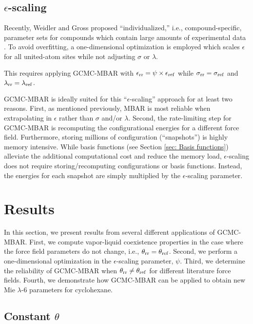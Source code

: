 \documentclass[journal=jced,manuscript=article]{achemso}
\begin{document}
\subsection{$\epsilon$-scaling}

Recently, Weidler and Gross proposed ``individualized,'' i.e., compound-specific, parameter sets for compounds which contain large amounts of experimental data \cite{Weidler2018}. To avoid overfitting, a one-dimensional optimization is employed which scales $\epsilon$ for all united-atom sites while not adjusting $\sigma$ or $\lambda$. 

This requires applying GCMC-MBAR with $\epsilon_{\rm rr} = \psi \times \epsilon_{\rm ref}$ while $\sigma_{\rm rr} = \sigma_{\rm ref}$ and $\lambda_{\rm rr} = \lambda_{\rm ref}$.

GCMC-MBAR is ideally suited for this ``$\epsilon$-scaling'' approach for at least two reasons. First, as mentioned previously, MBAR is most reliable when extrapolating in $\epsilon$ rather than $\sigma$ and/or $\lambda$. Second, the rate-limiting step for GCMC-MBAR is recomputing the configurational energies for a different force field. Furthermore, storing millions of configuration (``snapshots'') is highly memory intensive. While basis functions (see Section \ref{sec: Basis functions}) alleviate the additional computational cost and reduce the memory load, $\epsilon$-scaling does not require storing/recomputing configurations or basis functions. Instead, the energies for each snapshot are simply multiplied by the $\epsilon$-scaling parameter.  

\section{Results} \label{sec: Results}

In this section, we present results from several different applications of GCMC-MBAR. First, we compute vapor-liquid coexistence properties in the case where the force field parameters do not change, i.e., $\theta_{\rm rr} = \theta_{\rm ref}$. Second, we perform a one-dimensional optimization in the $\epsilon$-scaling parameter, $\psi$.  Third, we determine the reliability of GCMC-MBAR when $\theta_{\rm rr} \neq \theta_{\rm ref}$ for different literature force fields. Fourth, we demonstrate how GCMC-MBAR can be applied to obtain new Mie $\lambda$-6 parameters for cyclohexane.

\subsection{Constant $\theta$}
\end{document}
